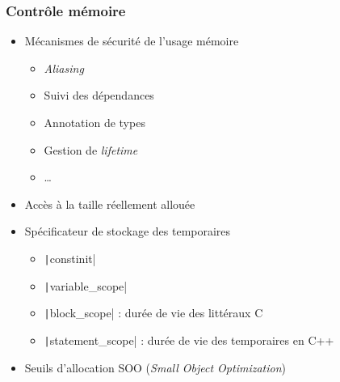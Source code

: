 \documentclass[C++.tex]{subfiles}
\begin{document}
\begin{frame}[fragile]
	\frametitle{Contrôle mémoire}
	\begin{itemize}
		\item Mécanismes de sécurité de l'usage mémoire
		\begin{itemize}
			\item \textit{Aliasing}
			\item Suivi des dépendances
			\item Annotation de types
			\item Gestion de \textit{lifetime}
			\item \ldots
		\end{itemize}

		\item Accès à la taille réellement allouée
		\item Spécificateur de stockage des temporaires
		\begin{itemize}
			\item \texttt|constinit|
			\item \texttt|variable_scope|
			\item \texttt|block_scope| : durée de vie des littéraux C
			\item \texttt|statement_scope| : durée de vie des temporaires en C++
		\end{itemize}
		\item Seuils d'allocation SOO (\textit{Small Object Optimization})
	\end{itemize}

\end{frame}
\end{document}
